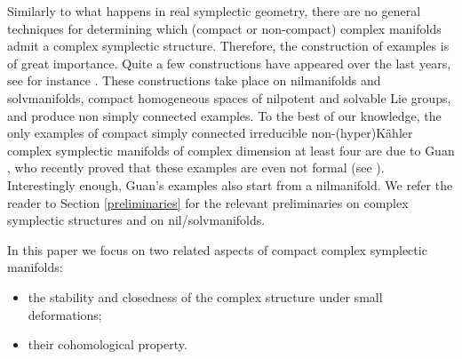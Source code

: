 \documentclass[a4paper]{amsart}
\theoremstyle{definition}
\theoremstyle{remark}
\numberwithin{equation}{section}
\begin{document}
Similarly to what happens in real symplectic geometry, there are no general techniques for determining which (compact or non-compact) complex manifolds admit a complex symplectic structure. Therefore, the construction of examples is of great importance. Quite a few constructions have appeared over the last years, see for instance \cite{bazzoni-freibert-latorre-meinke,BFLT,BGGL}. These constructions take place on nilmanifolds and solvmanifolds, compact homogeneous spaces of nilpotent and solvable Lie groups, and produce non simply connected examples. To the best of our knowledge, the only examples of compact simply connected irreducible non-(hyper)K\"ahler complex symplectic manifolds of complex dimension at least four are due to Guan \cite{Guan1}, who recently proved that these examples are even not formal (see \cite{Guan2}). Interestingly enough, Guan's examples also start from a nilmanifold. We refer the reader to Section \ref{preliminaries} for the relevant preliminaries on complex symplectic structures and on nil/solvmanifolds.

In this paper we focus on two related aspects of compact complex symplectic manifolds:
\begin{itemize}
    \item the stability and closedness of the complex structure under small deformations;
    \item their cohomological property.
\end{itemize}
\end{document}
